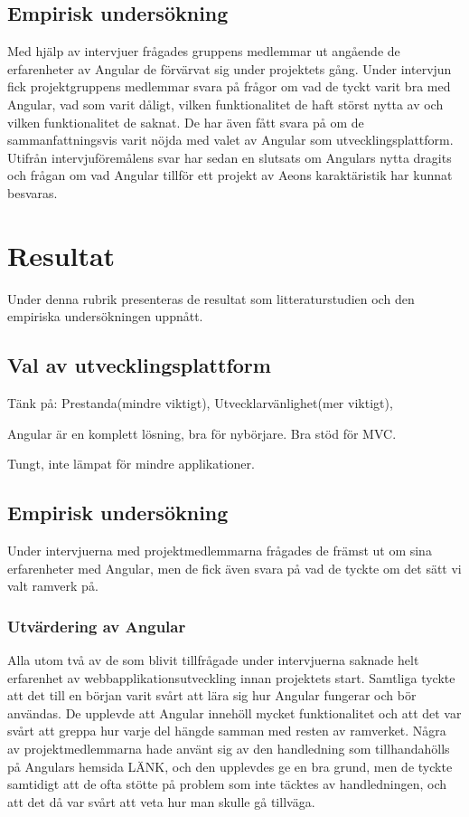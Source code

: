 \subsection{Empirisk undersökning} 

Med hjälp av intervjuer frågades gruppens medlemmar ut angående de erfarenheter av Angular de förvärvat sig under projektets gång. Under intervjun fick projektgruppens medlemmar svara på frågor om vad de tyckt varit bra med Angular, vad som varit dåligt, vilken funktionalitet de haft störst nytta av och vilken funktionalitet de saknat. De har även fått svara på om de sammanfattningsvis varit nöjda med valet av Angular som utvecklingsplattform. Utifrån intervjuföremålens svar har sedan en slutsats om Angulars nytta dragits och frågan om vad Angular tillför ett projekt av Aeons karaktäristik har kunnat besvaras.

\section{Resultat}

Under denna rubrik presenteras de resultat som litteraturstudien och den empiriska undersökningen uppnått.

\subsection{Val av utvecklingsplattform}

Tänk på: Prestanda(mindre viktigt), Utvecklarvänlighet(mer viktigt), 

Angular är en komplett lösning, bra för nybörjare. Bra stöd för MVC. 

Tungt, inte lämpat för mindre applikationer.

\subsection{Empirisk undersökning}

Under intervjuerna med projektmedlemmarna frågades de främst ut om sina erfarenheter med Angular, men de fick även svara på vad de tyckte om det sätt vi valt ramverk på. 

\subsubsection{Utvärdering av Angular}

Alla utom två av de som blivit tillfrågade under intervjuerna saknade helt erfarenhet av webbapplikationsutveckling innan projektets start. Samtliga tyckte att det till en början varit svårt att lära sig hur Angular fungerar och bör användas. De upplevde att Angular innehöll mycket funktionalitet och att det var svårt att greppa hur varje del hängde samman med resten av ramverket. Några av projektmedlemmarna hade använt sig av den handledning som tillhandahölls på Angulars hemsida LÄNK, och den upplevdes ge en bra grund, men de tyckte samtidigt att de ofta stötte på problem som inte täcktes av handledningen, och att det då var svårt att veta hur man skulle gå tillväga.


